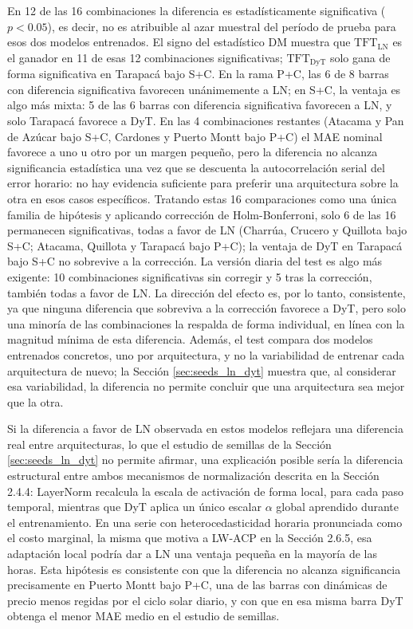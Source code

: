En 12 de las 16 combinaciones la diferencia es estadísticamente significativa ($p<0.05$), es decir, no es atribuible al azar muestral del período de prueba para esos dos modelos entrenados. El signo del estadístico DM muestra que $\text{TFT}_\text{LN}$ es el ganador en 11 de esas 12 combinaciones significativas; $\text{TFT}_\text{DyT}$ solo gana de forma significativa en Tarapacá bajo S+C. En la rama P+C, las 6 de 8 barras con diferencia significativa favorecen unánimemente a LN; en S+C, la ventaja es algo más mixta: 5 de las 6 barras con diferencia significativa favorecen a LN, y solo Tarapacá favorece a DyT. En las 4 combinaciones restantes (Atacama y Pan de Azúcar bajo S+C, Cardones y Puerto Montt bajo P+C) el MAE nominal favorece a uno u otro por un margen pequeño, pero la diferencia no alcanza significancia estadística una vez que se descuenta la autocorrelación serial del error horario: no hay evidencia suficiente para preferir una arquitectura sobre la otra en esos casos específicos. Tratando estas 16 comparaciones como una única familia de hipótesis y aplicando corrección de Holm-Bonferroni, solo 6 de las 16 permanecen significativas, todas a favor de LN (Charrúa, Crucero y Quillota bajo S+C; Atacama, Quillota y Tarapacá bajo P+C); la ventaja de DyT en Tarapacá bajo S+C no sobrevive a la corrección. La versión diaria del test es algo más exigente: 10 combinaciones significativas sin corregir y 5 tras la corrección, también todas a favor de LN. La dirección del efecto es, por lo tanto, consistente, ya que ninguna diferencia que sobreviva a la corrección favorece a DyT, pero solo una minoría de las combinaciones la respalda de forma individual, en línea con la magnitud mínima de esta diferencia. Además, el test compara dos modelos entrenados concretos, uno por arquitectura, y no la variabilidad de entrenar cada arquitectura de nuevo; la Sección \ref{sec:seeds_ln_dyt} muestra que, al considerar esa variabilidad, la diferencia no permite concluir que una arquitectura sea mejor que la otra.

Si la diferencia a favor de LN observada en estos modelos reflejara una diferencia real entre arquitecturas, lo que el estudio de semillas de la Sección \ref{sec:seeds_ln_dyt} no permite afirmar, una explicación posible sería la diferencia estructural entre ambos mecanismos de normalización descrita en la Sección 2.4.4: LayerNorm recalcula la escala de activación de forma local, para cada paso temporal, mientras que DyT aplica un único escalar $\alpha$ global aprendido durante el entrenamiento. En una serie con heterocedasticidad horaria pronunciada como el costo marginal, la misma que motiva a LW-ACP en la Sección 2.6.5, esa adaptación local podría dar a LN una ventaja pequeña en la mayoría de las horas. Esta hipótesis es consistente con que la diferencia no alcanza significancia precisamente en Puerto Montt bajo P+C, una de las barras con dinámicas de precio menos regidas por el ciclo solar diario, y con que en esa misma barra DyT obtenga el menor MAE medio en el estudio de semillas.


